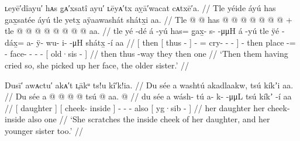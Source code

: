 \ex\label{ex:92-30-crying-pick-up-face}%
%
\begingl
	\glpreamble	ʟeyē′dîayu′ hᴀs g̣ᴀ′xsatî ayu′ ʟēyᴀ′tx aỵā′wacat cᴀtxē′a. //
	\glpreamble	Tle yéide áyú has gax̱satée áyú tle yetx̱ aÿaawashát shátx̱i aa. //
	\gla	{} Tle {}  @ {} {}  @ {}
			has @  @ {} @ {} @ {} @ {} @ {} {}
		 @ {} +
		tle  @ {} @  @ {} @ {} @ {} @ {} @ {}
		{}  @ {} aa. {} //
	\glb	{} tle {} yé -dé {} á -yú
			has= g̱ax̱- {} s-  -μμH {} {}
		á -yú
		tle ÿé -dáx̱= a- ÿ- wu- i-  -μH
		{} shátx̱ -í aa {} //
	\glc	{}[ then {}[ thus - {}]  -
			= cry- \· -
				 - \· {}]
		 -
		then place -= - face- - -  -
		{}[ old·sis -  {}] //
	\gld	{} then {} thus -way {}  {}
			they  {} {} {} {} {} {}
		 {}
		then  {}  {} {} {} {} {}
		{}  {} one {} //
	\glft	‘Then them having cried so, she picked up her face, the older sister.’
		//
\endgl
\xe



\ex\label{ex:92-31-scratch-inside-cheek}%
%
\begingl
	\glpreamble	Dusī′ awᴀctu′ akᴀ′t ʟ̣ākᵘ ts!u kî′k!ia. //
	\glpreamble	Du sée a washtú akadlaakw, tsú kíkʼi aa. //
	\gla	{} Du sée {} {} a  @ {} {}
		 @ {} @ {} @ {}
		tsú {}  @ {} aa. @ {} //
	\glb	{} du sée {} {} a wásh- tú {}
		a- k-  -μμL
		tsú {} kíkʼ -í aa {} //
	\glc	{}[  daughter {}] {}[  cheek- inside {}]
		- -  -
		also {}[ yg·sib -  {}] //
	\gld	{} her daughter {} {} her cheek- inside {}
		 {} {} {}
		also {}  {} one {} //
	\glft	‘She scratches the inside cheek of her daughter, and her younger sister too.’
		//
\endgl
\xe

